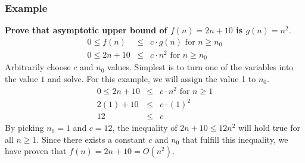 \subsubsection{Example}
\textbf{Prove that asymptotic upper bound of $f(n) = 2n+10$ is $g(n) = n^2$}.
\begin{eqnarray*}
	0 \leq f(n) &\leq& c \cdot g(n) \text{ for } n \geq n_0\\
	0 \leq 2n + 10 &\leq& c \cdot n^2 \text{ for } n \geq n_0
\end{eqnarray*}
Arbitrarily choose $c$ and $n_0$ values. Simplest is to turn one of the variables into the value $1$ and solve. For this example, we will assign the value 1 to $n_0$.
\begin{eqnarray*}
	0 \leq 2n + 10 &\leq& c \cdot n^2 \text{ for } n \geq 1\\
	2(1) + 10 &\leq& c \cdot (1)^2\\
	12 &\leq& c
\end{eqnarray*}
By picking $n_0 = 1$ and $c = 12$, the inequality of $2n+10 \leq 12n^2$ will hold true for all $n \geq 1$. Since there exists a constant $c$ and $n_0$ that fulfill this inequality, we have proven that $f(n) = 2n+10 = O(n^2)$.